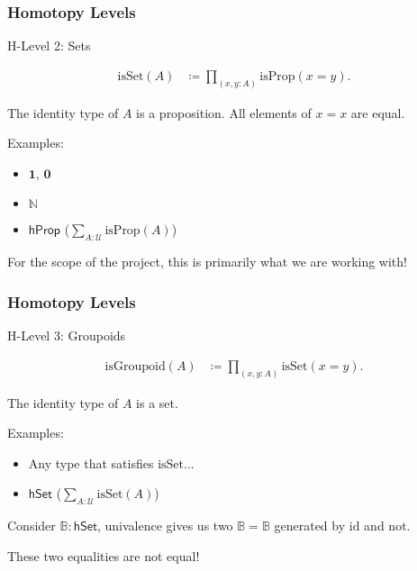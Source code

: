 \documentclass{beamer}
\begin{document}
\begin{frame}
\frametitle{Homotopy Levels}

H-Level 2: Sets

\begin{align*}
  \text{isSet}(A) & \coloneqq \prod_{(x,y:A)} \text{isProp}(x = y).
\end{align*}

The identity type of $A$ is a proposition.
All elements of $x = x$ are equal.

Examples:
\begin{itemize}
  \item $\mathbf{1}$, $\mathbf{0}$
  \item $\mathbb{N}$
  \item $\mathsf{hProp}$ ($\sum_{A : \mathcal{U}} \text{isProp}(A)$)
\end{itemize}

For the scope of the project, this is primarily what we are working with!

\end{frame}

\begin{frame}
\frametitle{Homotopy Levels}

H-Level 3: Groupoids

\begin{align*}
  \text{isGroupoid}(A) & \coloneqq \prod_{(x,y:A)} \text{isSet}(x = y).
\end{align*}

The identity type of $A$ is a set.

Examples:
\begin{itemize}
  \item Any type that satisfies $\text{isSet}$...
  \item $\mathsf{hSet}$ ($\sum_{A : \mathcal{U}} \text{isSet}(A)$)
\end{itemize}

Consider $\mathbb{B} : \mathsf{hSet}$, univalence gives us two $\mathbb{B} = \mathbb{B}$
generated by $\text{id}$ and $\text{not}$.

These two equalities are not equal!

\end{frame}
\end{document}
